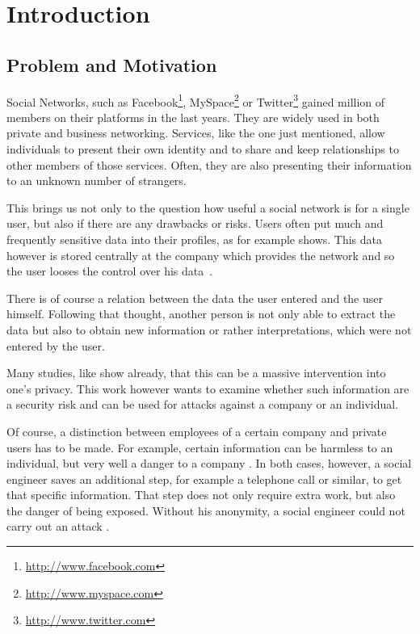 \chapter{Introduction}
\label{chapter:introduction}

\section{Problem and Motivation}

Social Networks, such as Facebook\footnote{\url{http://www.facebook.com}},
MySpace\footnote{\url{http://www.myspace.com}} or
Twitter\footnote{\url{http://www.twitter.com}} gained million of members on
their platforms in the last years. They are widely used in both private and
business networking. Services, like the one just mentioned, allow individuals
to present their own identity and to share and keep relationships to other
members of those services. Often, they are also presenting their information to
an unknown number of strangers.

This brings us not only to the question how useful a social network is for a
single user, but also if there are any drawbacks or risks.  Users often put
much and frequently sensitive data into their profiles, as for example
\cite{brown2008} shows.  This data however is stored centrally at the company
which provides the network and so the user looses the control over his
data~\cite{fraunhofer2008}.

There is of course a relation between the data the user entered and the user
himself. Following that thought, another person is not only able to extract the
data but also to obtain new information or rather interpretations, which were
not entered by the user.

Many studies, like \cite{fraunhofer2008,gross2005} show already, that this can
be a massive intervention into one's privacy. This work however wants to examine
whether such information are a security risk and can be used for attacks
against a company or an individual.

Of course, a distinction between employees of a certain company and private
users has to be made. For example, certain information can be harmless to an
individual, but very well a danger to a company \cite{mitnick2003}. In both
cases, however, a social engineer saves an additional step, for example a
telephone call or similar, to get that specific information. That step does not
only require extra work, but also the danger of being exposed. Without his
anonymity, a social engineer could not carry out an attack \cite{mitnick2003}.

